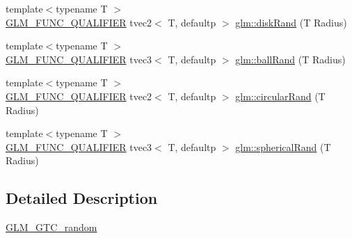 \begin{DoxyCompactItemize}
{\footnotesize template$<$typename T $>$ }\\\mbox{\hyperlink{setup_8hpp_a33fdea6f91c5f834105f7415e2a64407}{G\+L\+M\+\_\+\+F\+U\+N\+C\+\_\+\+Q\+U\+A\+L\+I\+F\+I\+ER}} tvec2$<$ T, defaultp $>$ \mbox{\hyperlink{group__gtc__random_gad3a3ee7d26502a31ba552cb627a68606}{glm\+::disk\+Rand}} (T Radius)
\item 
{\footnotesize template$<$typename T $>$ }\\\mbox{\hyperlink{setup_8hpp_a33fdea6f91c5f834105f7415e2a64407}{G\+L\+M\+\_\+\+F\+U\+N\+C\+\_\+\+Q\+U\+A\+L\+I\+F\+I\+ER}} tvec3$<$ T, defaultp $>$ \mbox{\hyperlink{group__gtc__random_ga5506dee301160e3a06aef9b9bc7a0a83}{glm\+::ball\+Rand}} (T Radius)
\item 
{\footnotesize template$<$typename T $>$ }\\\mbox{\hyperlink{setup_8hpp_a33fdea6f91c5f834105f7415e2a64407}{G\+L\+M\+\_\+\+F\+U\+N\+C\+\_\+\+Q\+U\+A\+L\+I\+F\+I\+ER}} tvec2$<$ T, defaultp $>$ \mbox{\hyperlink{group__gtc__random_gae989c26a2899b2fb7444abe7c275c29c}{glm\+::circular\+Rand}} (T Radius)
\item 
{\footnotesize template$<$typename T $>$ }\\\mbox{\hyperlink{setup_8hpp_a33fdea6f91c5f834105f7415e2a64407}{G\+L\+M\+\_\+\+F\+U\+N\+C\+\_\+\+Q\+U\+A\+L\+I\+F\+I\+ER}} tvec3$<$ T, defaultp $>$ \mbox{\hyperlink{group__gtc__random_gaa9a6fc2d7a295b3857f7db23b1053d9d}{glm\+::spherical\+Rand}} (T Radius)
\end{DoxyCompactItemize}


\subsection{Detailed Description}
\mbox{\hyperlink{group__gtc__random}{G\+L\+M\+\_\+\+G\+T\+C\+\_\+random}} 